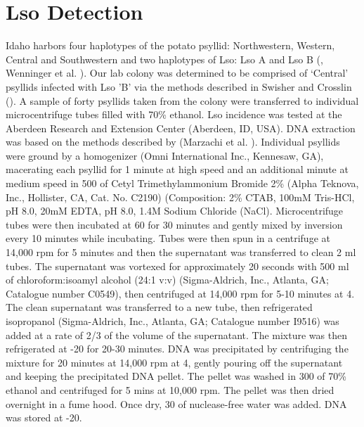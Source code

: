 \documentclass{UIdahoMastersThesis}
\begin{document}
\section{Lso Detection}
\label{sec:pcr}
Idaho harbors four haplotypes of the potato psyllid: Northwestern, Western, Central and Southwestern and two haplotypes of Lso: Lso A and Lso B (\cite{Dahan2017}, Wenninger et al. \citeyear{Wenninger2017}).  Our lab colony was determined to be comprised of ‘Central’ psyllids infected with Lso 'B' via the methods described in Swisher and Crosslin (\citeyear{Swisher2014a}).
A sample of forty psyllids taken from the colony were transferred to individual microcentrifuge tubes filled with 70\% ethanol. Lso incidence was tested at the Aberdeen Research and Extension Center (Aberdeen, ID, USA). DNA extraction was based on the methods described by (Marzachi et al. \citeyear{Marzachi1998}). Individual psyllids were ground by a homogenizer (Omni International Inc., Kennesaw, GA), macerating each psyllid for 1 minute at high speed and an additional minute at medium speed in 500 {\micro\litre} of Cetyl Trimethylammonium Bromide 2\% (Alpha Teknova, Inc., Hollister, CA, Cat. No. C2190) (Composition: 2\% CTAB, 100mM Tris-HCl, pH 8.0, 20mM EDTA, pH 8.0, 1.4M Sodium Chloride (NaCl). Microcentrifuge tubes were then incubated at 60{\degreeCelsius} for 30 minutes and gently mixed by inversion every 10 minutes while incubating. Tubes were then spun in a centrifuge at 14,000 rpm for 5 minutes and then the supernatant was transferred to clean 2 ml tubes. The supernatant was vortexed for approximately 20 seconds with 500 ml of chloroform:isoamyl alcohol (24:1 v:v) (Sigma-Aldrich, Inc., Atlanta, GA; Catalogue number C0549), then centrifuged at 14,000 rpm for 5-10 minutes at 4{\degreeCelsius}. The clean supernatant was transferred to a new tube, then refrigerated isopropanol (Sigma-Aldrich, Inc., Atlanta, GA; Catalogue number I9516) was added at a rate of 2/3 of the volume of the supernatant. The mixture was then refrigerated at -20{\degreeCelsius} for 20-30 minutes. DNA was precipitated by centrifuging the mixture for 20 minutes at 14,000 rpm at 4{\degreeCelsius}, gently pouring off the supernatant and keeping the precipitated DNA pellet. The pellet was washed in 300 {\micro\liter} of 70\% ethanol and centrifuged for 5 mins at 10,000 rpm. The pellet was then dried overnight in a fume hood. Once dry, 30 {\micro\litre} of nuclease-free water was added. DNA was stored at -20{\degreeCelsius}.
\end{document}
